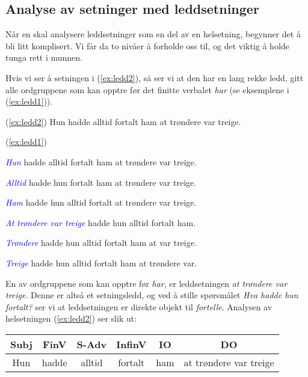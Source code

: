 \documentclass{article}
\begin{document}
\subsection{Analyse av setninger med leddsetninger}

N{\aa}r en skal analysere leddsetninger som en del av en helsetning, begynner det {\aa} bli litt komplisert. Vi f{\aa}r da to niv{\aa}er {\aa} forholde oss til, og det viktig {\aa} holde tunga rett i munnen.

Hvis vi ser {\aa} setningen i (\ref{ex:ledd2}), s{\aa} ser vi at den har en lang rekke ledd, gitt alle ordgruppene som kan opptre f{\o}r det finitte verbalet {\it har} (se eksemplene i (\ref{ex:ledd1})).

\begin{exe}
\ex\label{ex:ledd2} (\ref{ex:ledd2}) Hun hadde alltid fortalt ham at tr{\o}ndere var treige.
\end{exe}

\begin{exe}
\ex\label{ex:ledd1} (\ref{ex:ledd1})
\begin{xlist}
\ex \textcolor{blue}{\it Hun} hadde alltid fortalt ham at tr{\o}ndere var treige.

\ex \textcolor{blue}{\it Alltid} hadde hun fortalt ham at tr{\o}ndere var treige.

\ex \textcolor{blue}{\it Ham} hadde hun alltid fortalt at tr{\o}ndere var treige.

\ex \textcolor{blue}{\it At tr{\o}ndere var treige} hadde hun alltid fortalt ham.

\ex \textcolor{blue}{\it Tr{\o}ndere} hadde hun alltid fortalt ham at var treige.

\ex \textcolor{blue}{\it Treige} hadde hun alltid fortalt ham at tr{\o}ndere var.
\end{xlist}
\end{exe}

En av ordgruppene som kan opptre f{\o}r {\it har}, er leddsetningen {\it at tr{\o}ndere var treige}. Denne er alts{\aa} et setningsledd, og ved {\aa} stille sp{\o}rsm{\aa}let {\it Hva hadde hun fortalt?} ser vi at leddsetningen er direkte objekt til {\it fortelle}. Analysen av helsetningen (\ref{ex:ledd2}) ser slik ut:

\begin{table}[!ht]
\begin{tabular}{|c|c|c|c|c|c|}
\hline
Subj & FinV & S-Adv & InfinV & IO & DO\\\hline
Hun & hadde & alltid & fortalt & ham & at tr{\o}ndere var treige\\\hline
\end{tabular}
\end{table}
\end{document}
